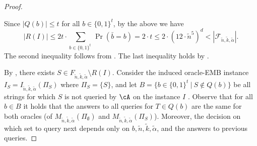 \begin{proof}
\begin{claimproof}
Since $\left|Q(b)\right| \leq t$ for all $b \in \{0,1\}^t$, by the above we have
			\begin{equation*}
				|R(I)| 	\leq 2  t \cdot \sum_{b \in \{0,1\}^{t}~} \Pr (\bar{b} = b) = 2  \cdot t \leq 2\cdot	\left(	12 \cdot \tilde{n}^5 \right)^{d} 
				< |\mathcal{F}_{\tilde{n},\tilde{k},\tilde{\alpha}}|. 
			\end{equation*}
			The second inequality follows from . The last inequality holds by . 
		\end{claimproof}
	
	By , there exists $S \in F_{\tilde{n},\tilde{k},\tilde{\alpha}} \setminus R(I)$. %
		Consider the induced oracle-EMB instance %
		$I_S = I_{\tilde{n},\tilde{k},\tilde{\alpha}}(\Pi_S)$ where $\Pi_{S} = \{S\}$, and let $B = \{b \in \{0,1\}^t~|~ S \notin Q(b)\}$ be all strings for which $S$ is not queried by $\cA$ on the instance $I$ .
	Observe that for all $b \in B$ it holds that the answers to all queries for $T \in Q(b)$ are the same for both oracles (of $M_{\tilde{n},\tilde{k},\tilde{\alpha}}(\Pi_{\emptyset})$ and $M_{\tilde{n},\tilde{k},\tilde{\alpha}}(\Pi_{S})$). Moreover, the decision on which set to query next depends only on $b,\tilde{n},\tilde{k},\tilde{\alpha}$, and the answers to previous queries.  
	

\end{proof}

